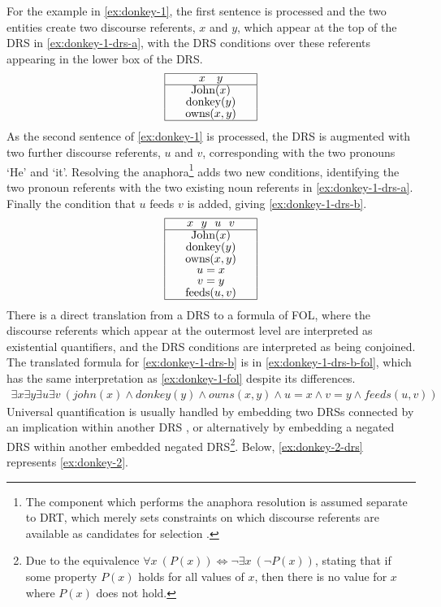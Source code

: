 \documentclass[a4paper,12pt,leqno,twoside]{article}
\def\drs#1#2{
\renewcommand{\arraystretch}{0.8}
\begin{tabular}[c]{|>{\hspace{1pc}}c<{\hspace{1pc}}|}
	\hline #1 \\
	\hline #2 \\
	\hline
\end{tabular}
\renewcommand{\arraystretch}{1}
}
\begin{document}
For the example in \cref{ex:donkey-1}, the first sentence is processed and the two entities create two discourse referents, $x$ and $y$, which appear at the top of the DRS in \cref{ex:donkey-1-drs-a}, with the DRS conditions over these referents appearing in the lower box of the DRS.
\begin{align}
	\drs{$x~~~y$}{John($x$)\\donkey($y$)\\owns($x, y$)}\label{ex:donkey-1-drs-a}
\end{align}
As the second sentence of \cref{ex:donkey-1} is processed, the DRS is augmented with two further discourse referents, $u$ and $v$, corresponding with the two pronouns `He' and `it'. Resolving the anaphora\footnote{The component which performs the anaphora resolution is assumed separate to DRT, which merely sets constraints on which discourse referents are available as candidates for selection \citep[p. 399]{Bird2009}.} adds two new conditions, identifying the two pronoun referents with the two existing noun referents in \cref{ex:donkey-1-drs-a}. Finally the condition that $u$ feeds $v$ is added, giving \cref{ex:donkey-1-drs-b}.
\begin{align}
	\drs{$x~~y~~u~~v$}{John($x$)\\donkey($y$)\\owns($x, y$)\\$u = x$\\$v = y$\\feeds($u, v$)}\label{ex:donkey-1-drs-b}
\end{align}
There is a direct translation from a DRS to a formula of FOL, where the discourse referents which appear at the outermost level are interpreted as existential quantifiers, and the DRS conditions are interpreted as being conjoined. The translated formula for \cref{ex:donkey-1-drs-b} is in \cref{ex:donkey-1-drs-b-fol}, which has the same interpretation as \cref{ex:donkey-1-fol} despite its differences.
\begin{align}
	\exists x \exists y \exists u \exists v ~(john(x) \land donkey(y) \land owns(x,y) \land u = x \land v = y \land feeds(u, v))\label{ex:donkey-1-drs-b-fol}
\end{align}
Universal quantification is usually handled by embedding two DRSs connected by an implication within another DRS \citep[p. 98]{kamp1988discourse}, or alternatively by embedding a negated DRS within another embedded negated DRS\footnote{Due to the equivalence $\forall x~(P(x)) \Longleftrightarrow \lnot \exists x ~(\lnot P(x))$, stating that if some property $P(x)$ holds for all values of $x$, then there is no value for $x$ where $P(x)$ does not hold.}. Below, \cref{ex:donkey-2-drs} represents \cref{ex:donkey-2}.
\end{document}
